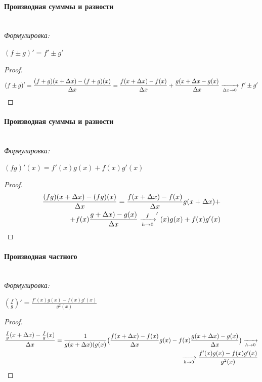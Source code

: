 \documentclass{article}
\let\vanillaparagraph\paragraph
\renewcommand{\paragraph}[1]{\vanillaparagraph{#1}\mbox{}\\}
\begin{document}
\paragraph{Производная сумммы и разности}

\textit{Формулировка: }

$(f\pm g)' = f' \pm g'$

\begin{proof}
\begin{equation}
(f\pm g)' = \frac{(f+g)(x+\Delta x) - (f+g)(x)}{\Delta x} = \frac{f(x + \Delta x) - f(x)}{\Delta x} + \frac{g(x + \Delta x - g(x)} {\Delta x} \xrightarrow[\Delta x \to 0]{} f' \pm g' \notag
\end{equation}
\end{proof}

\paragraph{Производная сумммы и разности}

\textit{Формулировка: }

$(fg)'(x) = f'(x)g(x) + f(x)g'(x)$

\begin{proof}
\begin{eqnarray}
\frac{(fg)(x + \Delta x) - (fg)(x)} {\Delta x} = \frac{f(x + \Delta x) - f(x)} {\Delta x} g(x + \Delta x)+ \notag\\
+ f(x) \frac{g + \Delta x) - g(x)} {\Delta x} \xrightarrow[h\to 0] f'(x)g(x) + f(x)g'(x)\notag
\end{eqnarray}
\end{proof}

\paragraph{Производная частного}

\textit{Формулировка: }

$\left(\frac{f}{g}\right)' = \frac{f'(x)g(x) - f(x)g'(x)}{g^2(x)}$

\begin{proof}
\begin{eqnarray}
\frac{\frac{f}{g}(x + \Delta x) - \frac{f}{g}(x)}{\Delta x}=\frac{1}{g(x + \Delta x)(g(x)} \big(\frac{f(x + \Delta x) - f(x)} {\Delta x} g(x) - f(x) \frac{g(x+ \Delta x) - g(x)} {\Delta x}\big) \xrightarrow[h\to 0]{}\notag \\
\xrightarrow[h\to 0]{} \frac{f'(x)g(x) - f(x)g'(x)}{g^2(x)}\notag
\end{eqnarray}
\end{proof}
\end{document}
